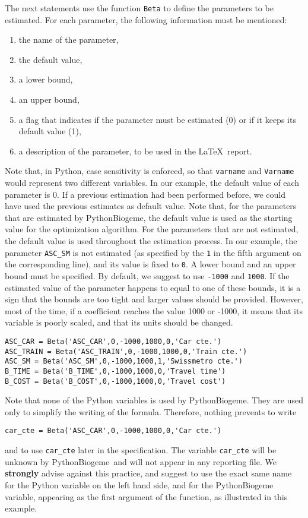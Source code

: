 \documentclass[12pt,a4paper]{article}
\newcommand{\PBIOGEME}{PythonBiogeme}
\begin{document}
The next statements use the function \lstinline+Beta+ to define the parameters to be estimated. For each parameter, the following information must be mentioned:
\begin{enumerate}
\item the name of the parameter,
\item the default value,
\item a lower bound,
\item an upper bound,
\item a flag that indicates if the parameter must be estimated (0) or
  if it keeps its default value (1),
\item a description of the parameter, to be used in the
  \LaTeX\ report. 
\end{enumerate}


Note that, in Python, case sensitivity is enforced, so that
\verb+varname+ and \verb+Varname+ would represent two different
variables.  In our example, the default value of each parameter is
0. If a previous estimation had been performed before, we could have
used the previous estimates as default value. Note that, for the
parameters that are estimated by \PBIOGEME, the default value is used
as the starting value for the optimization algorithm. For the
parameters that are not estimated, the default value is used
throughout the estimation process. In our example, the parameter
\lstinline$ASC_SM$ is not estimated (as specified by the \lstinline$1$
in the fifth argument on the corresponding line), and its value is
fixed to \lstinline$0$.  A lower bound and an upper bound must be
specified. By default, we suggest to use \lstinline$-1000$ and
\lstinline$1000$. If the estimated value of the parameter happens to
equal to one of these bounds, it is a sign that the bounds are too
tight and larger values should be provided. However, most of the time,
if a coefficient reaches the value 1000 or -1000, it means that its
variable is poorly scaled, and that its units should be changed.
\begin{lstlisting}[style=nonumbers]
ASC_CAR = Beta('ASC_CAR',0,-1000,1000,0,'Car cte.')
ASC_TRAIN = Beta('ASC_TRAIN',0,-1000,1000,0,'Train cte.')
ASC_SM = Beta('ASC_SM',0,-1000,1000,1,'Swissmetro cte.')
B_TIME = Beta('B_TIME',0,-1000,1000,0,'Travel time')
B_COST = Beta('B_COST',0,-1000,1000,0,'Travel cost')
\end{lstlisting}
Note that none of the Python variables is used by \PBIOGEME. They are
used only to simplify the writing of the formula. Therefore, nothing
prevents to write
\begin{lstlisting}[style=nonumbers]
car_cte = Beta('ASC_CAR',0,-1000,1000,0,'Car cte.')
\end{lstlisting}
and to use \lstinline+car_cte+ later in the specification. The
variable \lstinline+car_cte+ will be unknown by \PBIOGEME\ and will
not appear in any reporting file.   We
\textbf{strongly} advise against this practice, and suggest to use the
exact same name for the Python variable on the left hand side, and for
the PythonBiogeme variable, appearing as the first argument of the
function, as illustrated in this example. 
\end{document}
